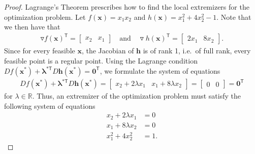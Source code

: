 \documentclass[12pt]{article}
\theoremstyle{definition}
\newcommand{\vc}[1]{\boldsymbol{#1}}
\newcommand{\tran}{\mathsf{T}}
\begin{document}
\begin{proof}
  Lagrange's Theorem prescribes how to find the local extremizers for the optimization problem. Let $f(\vc{x}) = x_1x_2$
  and $h(\vc{x}) = x_1^2 + 4x_2^2 - 1$.
  Note that we then have that
  \begin{align*}
    \triangledown f(\vc{x})^\tran =
    \begin{bmatrix}
      x_2 &
      x_1
    \end{bmatrix}
    \quad \text{and} \quad
    \triangledown h(\vc{x})^\tran =
    \begin{bmatrix}
      2x_1 &
      8x_2
    \end{bmatrix}.
  \end{align*}
  Since for every feasible $\vc{x}$, the Jacobian of $\vc{h}$ is of rank 1, i.e.\ of full rank,
  every feasible point is a regular point. Using the Lagrange condition
  $D f(\vc{x}^*) + \vc{\lambda}^{*\tran} D \vc{h}(\vc{x}^*) = \vc{0}^\tran$, we formulate
  the system of equations
  \begin{align*}
    D f(\vc{x}^*) + \vc{\lambda}^{*\tran} D \vc{h}(\vc{x}^*) =
    \begin{bmatrix}x_2 + 2\lambda x_1 & x_1 + 8\lambda x_2\end{bmatrix} =
    \begin{bmatrix}0 & 0\end{bmatrix} = \vc{0}^\tran
  \end{align*}
  for $\lambda \in \mathbb{R}.$
  Thus, an extremizer of the optimization problem must satisfy the following system of equations
  \begin{align*}
    x_2 + 2\lambda x_1 &= 0 \\
    x_1 + 8 \lambda x_2 &= 0 \\
    x_1^2 + 4x_2^2  &=1.
  \end{align*}


\end{proof}
\end{document}
